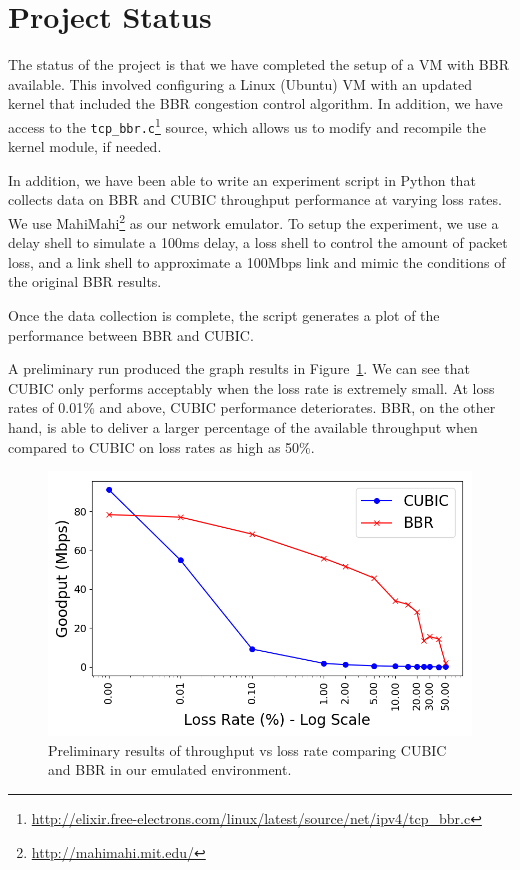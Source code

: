 
\section{Project Status}

The status of the project is that we have completed the setup of a VM with
BBR available. This involved configuring a Linux (Ubuntu) VM with an updated
kernel that included the BBR congestion control algorithm. In addition, we
have access to the \texttt{tcp\_bbr.c}\footnote{
\url{http://elixir.free-electrons.com/linux/latest/source/net/ipv4/tcp_bbr.c}}
source, which allows us to modify and recompile the kernel module, if needed.

In addition, we have been able to write an experiment script in Python that
collects data on BBR and CUBIC throughput performance at varying loss rates.
We use MahiMahi\footnote{\url{http://mahimahi.mit.edu/}} as our network
emulator. To setup the experiment, we use a delay shell to simulate a 100ms
delay, a loss shell to control the amount of packet loss, and a link
shell to approximate a 100Mbps link and mimic the conditions of the original
BBR results.

Once the data collection is complete, the script generates a plot of the
performance between BBR and CUBIC.

A preliminary run produced the graph results in Figure~\ref{fig:rebbr8}. We
can see that CUBIC only performs acceptably when the loss rate is extremely
small. At loss rates of 0.01\% and above, CUBIC performance deteriorates.
BBR, on the other hand, is able to deliver a larger percentage of the available
throughput when compared to CUBIC on loss rates as high as 50\%.


\begin{figure}[h]
  \centering
  \includegraphics[width=1.0\columnwidth]{./img/rebbr_fig8.png}
  \caption{Preliminary results of throughput vs loss rate comparing CUBIC and BBR in our
  emulated environment.}
  \label{fig:rebbr8}
\end{figure}


